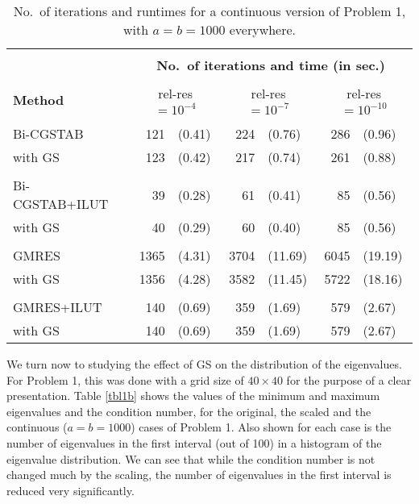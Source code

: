 \documentclass[12pt,a4paper]{article}
\newcounter{i}
\def\time{\!\times\!}
\begin{document}
\begin{table}[!h]
\centering
\begin{tabular}{|l|rl|rl|rl|}
\hline
&\multicolumn{6}{|c|}{}\\[-12pt]
&\multicolumn{6}{|c|}{\bf No.\ of iterations and time (in sec.)}\\
\hline&&&&&&\\[-11pt]
{\bf Method} & \multicolumn{2}{|c|}{rel-res $=\!10^{-4}$}
& \multicolumn{2}{|c|}{rel-res $=\!10^{-7}$}
& \multicolumn{2}{|c|}{rel-res $=\!10^{-10}$} \\
\hline&&&&&&\\[-12pt]
Bi-CGSTAB        & 121 & (0.41)	& 224 & (0.76)	& 286 & (0.96)  \\
with GS         & 123 & (0.42) & 217 & (0.74) & 261 & (0.88)  \\
\hline&&&&&&\\[-12pt]
Bi-CGSTAB+ILUT   & 39 & (0.28)  & 61 & (0.41) & 85 & (0.56) \\
with GS         & 40 & (0.29)  & 60 & (0.40)  & 85 & (0.56) \\
\hline&&&&&&\\[-12pt]
GMRES           & 1365 & (4.31) & 3704 & (11.69) & 6045 & (19.19) \\
with GS         & 1356 & (4.28) & 3582 & (11.45) & 5722 & (18.16) \\
\hline&&&&&&\\[-12pt]
GMRES+ILUT      & 140 & (0.69)	& 359 & (1.69)	& 579 & (2.67) \\
with GS         & 140 & (0.69) & 359 & (1.69) & 579 & (2.67) \\
\hline
\end{tabular}
\caption{No.\ of iterations and runtimes for a continuous version of
Problem 1, with $a=b=1000$ everywhere.}
\label{tbl1a}
\end{table}

We turn now to studying the effect of GS on the distribution of the 
eigenvalues.  For Problem 1, this was done with a grid size of 
$40\time 40$ for the purpose of a clear presentation.
Table \ref{tbl1b} shows the values of the minimum and maximum eigenvalues 
and the condition number, for the original, the scaled and the continuous 
($a=b=1000$) cases of Problem 1.  Also shown for each case is the number 
of eigenvalues in the first interval (out of 100) in a histogram of the 
eigenvalue distribution.  We can see that while the condition number is 
not changed much by the scaling, the number of eigenvalues in the first 
interval is reduced very significantly.
\end{document}
